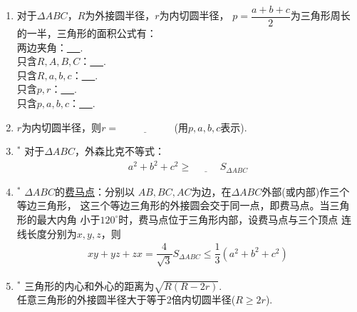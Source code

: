 \documentclass{article}
\newif\ifte
\renewcommand\leq\leqslant
\renewcommand\geq\geqslant
\begin{document}
\begin{multicols}{2}
\begin{enumerate}[leftmargin=20pt]
\item 对于$ \Delta ABC $，$ R $为外接圆半径，$ r $为内切圆半径，
$ p=\dfrac{a+b+c}{2} $为三角形周长的一半，三角形的面积公式有：\\
两边夹角：\underline{\ \ifte $ \dfrac{1}{2}ab\sin C=\dfrac{1}{2}
bc\sin A=\dfrac{1}{2}ac\sin B $\else \hspace{6cm} \fi\ }. \\
只含$ R,A,B,C $：\underline{\ \ifte 
$ 2R^2\sin A\sin B\sin C $\else \hspace{2cm} \fi\ }. \\
只含$ R,a,b,c $：\underline{\ \ifte 
$ \dfrac{abc}{4R} $\else \hspace{2cm} \fi\ }. \\
只含$ p,r $：\underline{\ \ifte $ pr $\else \hspace{2cm} \fi\ }.\\
只含$ p,a,b,c $：\underline{\ \ifte 
$ \sqrt{p(p-a)(p-b)(p-c)} $\else \hspace{4cm} \fi\ }. 

\item $ r $为内切圆半径，则$ r=\underline{\ \ifte 
    \sqrt{\dfrac{(p-a)(p-b)(p-c)}{p}}\else \hspace{2cm} \fi\ } $
\ifte \else (用$ p,a,b,c $表示)\fi.

\item $^*$ 对于$ \Delta ABC $，外森比克不等式：
\begin{gather*}
    a^2+b^2+c^2 \geq \underline{\ \ifte 
        4\sqrt{3}\else \hspace{1cm} \fi\ }S_{\Delta ABC} 
\end{gather*}

\item $^*$ $ \Delta ABC $的\underline{费马点}：分别以
$ AB,BC,AC $为边，在$ \Delta ABC $外部(或内部)作三个等边三角形，
这三个等边三角形的外接圆会交于同一点，即费马点。当三角形的最大内角
小于$ 120^{\circ} $时，费马点位于三角形内部，设费马点与三个顶点
连线长度分别为$ x,y,z $，则
\begin{gather*}
    xy+yz+zx=\dfrac{4}{\sqrt{3}}S_{\Delta ABC}\leq 
    \dfrac{1}{3}(a^2+b^2+c^2)
\end{gather*}

\item $^*$ 三角形的内心和外心的距离为$ \sqrt{R(R-2r)} $.\\
任意三角形的外接圆半径大于等于2倍内切圆半径($ R\geq2r $).


\end{enumerate}
\end{multicols}
\end{document}
